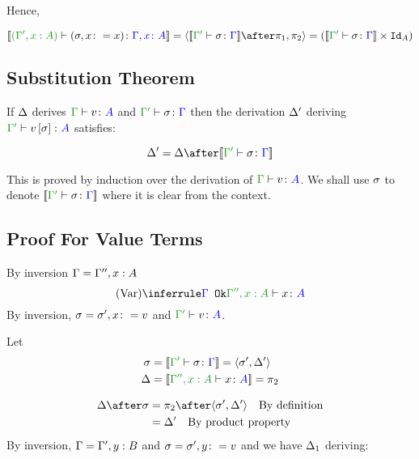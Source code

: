 \documentclass{report}
\begin{document}
Hence,

\begin{equation}
    \deno{\typerelation{(\G', x:A)}{(\si, x\setto x)}{\gax}} = \pr{\deno{\typerelation{\G'}{\si}{\G}}\after\p}{\pp} = (\deno{\typerelation{\G'}{\si}{\G}}\times \Id{A})
\end{equation}
\subsection{Substitution Theorem}

If $\Delta$ derives $\gtyperelation{v}{A}$ and $\typerelation{\G'}{\si}{\G}$ then the derivation $\Delta'$ deriving $\typerelation{\G'}{v\ssi}{A}$ satisfies:


\begin{framed}
    \begin{equation}
        \D' = \D \after\deno{\typerelation{\G'}{\si}{\G}}
    \end{equation}
    \centering
\end{framed}

This is proved by induction over the derivation of $\typerelation{\G}{v}{A}$.
We shall use $\sigma$ to denote $\deno{\typerelation{\G'}{\si}{\G}}$ where it is clear from the context.
\subsection{Proof For Value Terms}
By inversion $\Gamma = \Gamma'', x:A$
\begin{equation}
    \ntreeruleI{Var}{\ok{\G}}{\typerelation{\G'', x:A}{x}{A}}
\end{equation}
By inversion, $\sigma = \sigma', x\colon= v$ and $\typerelation{\G'}{v}{A}$.

Let 
\begin{align*}
    \si &=\deno{\typerelation{\G'}{\si}{\G}} = \pr{\si'}{\D'}\\
    \D &=\deno{\typerelation{\G'', x:A}{x}{A}} = \pp\\
\end{align*}

\begin{align*}
    \D\after\si &= \pp\after\pr{\si'}{\D'}\qt{By definition}\\
    &= \D'\qt{By product property}
\end{align*}
By inversion, $\Gamma = \Gamma', y:B$ and $\sigma = \sigma', y\colon= v$
and we have $\Delta_1$ deriving:
\end{document}
